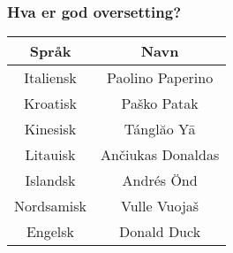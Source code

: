 \documentclass{beamer}
\begin{document}
\begin{frame}
\frametitle{Hva er god oversetting?}
\begin{tabular}{|c|c|}
\hline
\textbf{Språk} & \textbf{Navn} \\
\hline
Italiensk &  Paolino Paperino  \\
\hline
Kroatisk &  Paško Patak  \\
\hline
Kinesisk & Tánglăo Yā \\
\hline
Litauisk & Ančiukas Donaldas \\
\hline
Islandsk & Andrés Önd \\
\hline
Nordsamisk & Vulle Vuojaš \\
\hline
Engelsk & Donald Duck \\
\hline
\end{tabular}
\end{frame}

%
%
%
%
 
\end{document}
